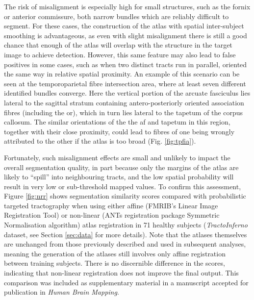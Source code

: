 The risk of misalignment is especially high for small structures, such as the fornix or anterior commissure, both narrow bundles which are reliably difficult to segment.
For these cases, the construction of the atlas with spatial inter-subject smoothing is advantageous, as even with slight misalignment there is still a good chance that enough of the atlas will overlap with the structure in the target image to achieve detection.
However, this same feature may also lead to false positives in some cases, such as when two distinct tracts run in parallel, oriented the same way in relative spatial proximity.
An example of this scenario can be seen at the temporoparietal fibre intersection area, where at least seven different identified bundles converge\autocite{Martino2013}.
Here the vertical portion of the arcuate fasciculus lies lateral to the sagittal stratum containing antero-posteriorly oriented association fibres (including the \gls{or}), which in turn lies lateral to the tapetum of the corpus callosum.
The similar orientations of the the \gls{af} and tapetum in this region, together with their close proximity, could lead to fibres of one being wrongly attributed to the other if the atlas is too broad (Fig. \ref{fig:tpfia}).

\begin{SCfigure}[][h!]
  
  \caption{Example of potential for atlas misalignment. The \gls{af} (A) and tapetum (T) are proximal and parallel at the temporoparietal fibre intersection area. Linearly registered right \gls{af} atlas \glspl{tod} may overlap with tapetum (arrowhead).}
  \label{fig:tpfia}
\end{SCfigure}

Fortunately, such misalignment effects are small and unlikely to impact the overall segmentation quality, in part because only the margins of the atlas are likely to ``spill'' into neighbouring tracts, and the low spatial probability will result in very low or sub-threshold mapped values.
To confirm this assessment, Figure \ref{fig:nrr} shows segmentation similarity scores compared with probabilistic targeted tractography when using either affine (FMRIB's Linear Image Registration Tool\autocite{Jenkinson2002}) or non-linear (ANTs registration package Symmetric Normalisation algorithm\autocite{Tustison2013,Avants2011}) atlas registration in 71 healthy subjects (\textit{TractoInferno} dataset, see Section \ref{sec:data} for more details).
Note that the atlases themselves are unchanged from those previously described and used in subsequent analyses, meaning the generation of the atlases still involves only affine registration between training subjects.
There is no discernible difference in the scores, indicating that non-linear registration does not improve the final output.
This comparison was included as supplementary material in a manuscript accepted for publication in \textit{Human Brain Mapping}\autocite{Young2024}.

